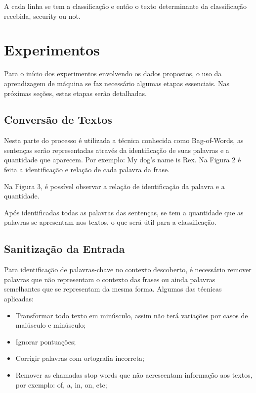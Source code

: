 \documentclass[conference]{IEEEtran}
\begin{document}
A cada linha se tem a classificação e então o texto determinante da classificação recebida, security ou not.

\section{Experimentos}

Para o início dos experimentos envolvendo os dados propostos, o uso da aprendizagem de máquina se faz necessário algumas etapas essenciais. Nas próximas seções, estas etapas serão detalhadas.

\subsection{Conversão de Textos}

Nesta parte do processo é utilizada a técnica conhecida como Bag-of-Words, as sentenças serão representadas através da identificação de suas palavras e a quantidade que aparecem.
Por exemplo: My dog’s name is Rex.
Na Figura 2 é feita a identificação e relação de cada palavra da frase.

Na Figura 3, é possível observar a relação de identificação da palavra e a quantidade.

Após identificadas todas as palavras das sentenças, se tem a quantidade que as palavras se apresentam nos textos, o que será útil para a classificação.

\subsection{Sanitização da Entrada}

Para identificação de palavras-chave no contexto descoberto, é necessário remover palavras que não representam o contexto das frases ou ainda palavras semelhantes que se representam da mesma forma. Algumas das técnicas aplicadas:

\begin{itemize}
    \item Transformar todo texto em minúsculo, assim não terá variações por casos de maiúsculo e minúsculo;
    \item Ignorar pontuações;
    \item Corrigir palavras com ortografia incorreta;
    \item Remover as chamadas stop words que não acrescentam informação aos textos, por exemplo:  of, a, in, on, etc;
\end{itemize}
\end{document}
